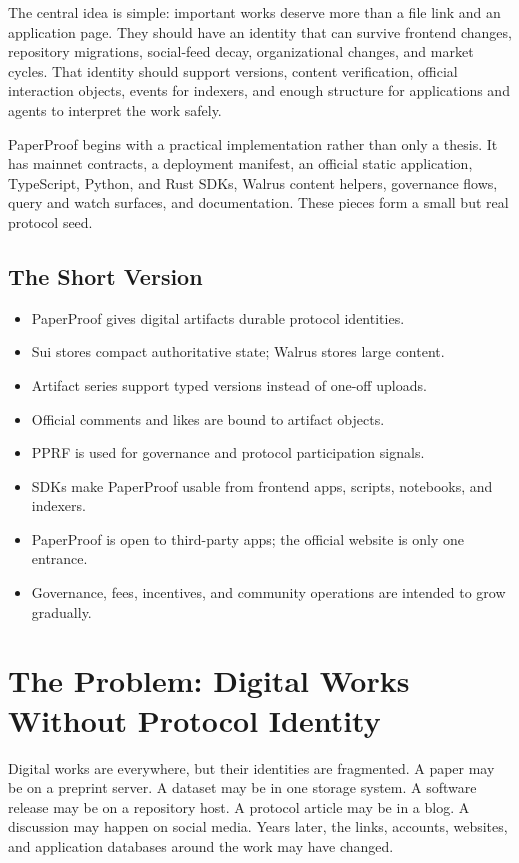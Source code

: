 \documentclass[11pt]{article}
\begin{document}
The central idea is simple: important works deserve more than a file link and an
application page. They should have an identity that can survive frontend changes,
repository migrations, social-feed decay, organizational changes, and market
cycles. That identity should support versions, content verification, official
interaction objects, events for indexers, and enough structure for applications
and agents to interpret the work safely.

PaperProof begins with a practical implementation rather than only a thesis. It
has mainnet contracts, a deployment manifest, an official static application,
TypeScript, Python, and Rust SDKs, Walrus content helpers, governance flows,
query and watch surfaces, and documentation. These pieces form a small but real
protocol seed.

\subsection{The Short Version}

\begin{itemize}[leftmargin=*]
  \item PaperProof gives digital artifacts durable protocol identities.
  \item Sui stores compact authoritative state; Walrus stores large content.
  \item Artifact series support typed versions instead of one-off uploads.
  \item Official comments and likes are bound to artifact objects.
  \item PPRF is used for governance and protocol participation signals.
  \item SDKs make PaperProof usable from frontend apps, scripts, notebooks, and indexers.
  \item PaperProof is open to third-party apps; the official website is only one entrance.
  \item Governance, fees, incentives, and community operations are intended to grow gradually.
\end{itemize}

\section{The Problem: Digital Works Without Protocol Identity}

Digital works are everywhere, but their identities are fragmented. A paper may
be on a preprint server. A dataset may be in one storage system. A software
release may be on a repository host. A protocol article may be in a blog. A
discussion may happen on social media. Years later, the links, accounts,
websites, and application databases around the work may have changed.
\end{document}
